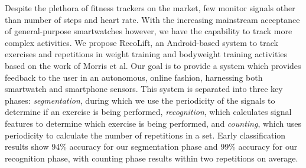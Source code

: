 Despite the plethora of fitness trackers on the market, few monitor signals other than number of steps and heart rate. With the increasing mainstream acceptance of general-purpose smartwatches however, we have the capability to track more complex activities. We propose RecoLift, an Android-based system to track exercises and repetitions in weight training and bodyweight training activities based on the work of Morris et al. Our goal is to provide a system which provides feedback to the user in an autonomous, online fashion, harnessing both smartwatch and smartphone sensors. This system is separated into three key phases: \textit{segmentation}, during which we use the periodicity of the signals to determine if an exercise is being performed, \textit{recognition}, which calculates signal features to determine which exercise is being performed, and \textit{counting}, which uses periodicity to calculate the number of repetitions in a set. Early classification results show 94\% accuracy for our segmentation phase and 99\% accuracy for our recognition phase, with counting phase results within two repetitions on average.
